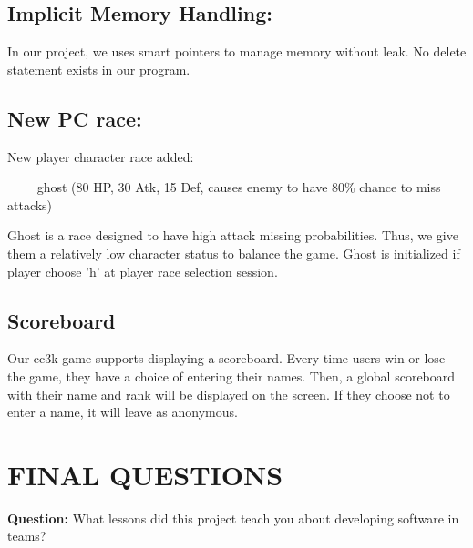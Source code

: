 \documentclass[11pt]{article}
\theoremstyle{plain} \newtheorem{theorem*}{Theorem}[subsection]
\begin{document}
\subsection{Implicit Memory Handling: }

In our project, we uses smart pointers to manage memory without leak. No delete 
statement exists in our program.

\subsection{New PC race: }

New player character race added: 

\textsf{\indent $\phantom{\qquad}$ ghost (80 HP, 30 Atk, 15 Def, causes enemy to 
have 80\% chance to miss attacks) }

Ghost is a race designed to have high attack missing probabilities. Thus, we 
give them a relatively low character status to balance the game. Ghost
is initialized if player choose 'h' at player race selection session.

\subsection{Scoreboard}

Our cc3k game supports displaying a scoreboard. 
Every time users win or lose the game, they have a choice of entering their 
names. Then, a global scoreboard with their name and rank will be displayed on 
the screen. If they choose not to enter a name, it will leave as anonymous. 








\section{FINAL QUESTIONS}

\textbf{Question:}
What lessons did this project teach you about developing software in teams? 
\end{document}

